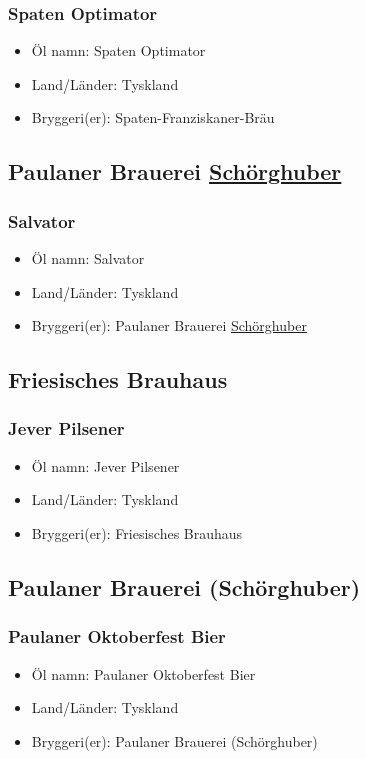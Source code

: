 \documentclass[11pt]{article}
\begin{document}
\subsubsection{Spaten Optimator}
\label{sec:orge6554e2}
\begin{itemize}
\item Öl namn: Spaten Optimator
\item Land/Länder: Tyskland
\item Bryggeri(er): Spaten-Franziskaner-Bräu
\end{itemize}
\subsection{Paulaner Brauerei \underline{Schörghuber}}
\label{sec:orgdc9c26c}
\subsubsection{Salvator}
\label{sec:orga4ef4f2}
\begin{itemize}
\item Öl namn: Salvator
\item Land/Länder: Tyskland
\item Bryggeri(er): Paulaner Brauerei \uline{Schörghuber}
\end{itemize}
\subsection{Friesisches Brauhaus}
\label{sec:org1a25ef1}
\subsubsection{Jever Pilsener}
\label{sec:orgd94fd62}
\begin{itemize}
\item Öl namn: Jever Pilsener
\item Land/Länder: Tyskland
\item Bryggeri(er): Friesisches Brauhaus
\end{itemize}
\subsection{Paulaner Brauerei (Schörghuber)}
\label{sec:org6366b9f}
\subsubsection{Paulaner Oktoberfest Bier}
\label{sec:org75e0021}
\begin{itemize}
\item Öl namn: Paulaner Oktoberfest Bier
\item Land/Länder: Tyskland
\item Bryggeri(er): Paulaner Brauerei (Schörghuber)
\end{itemize}
\end{document}
